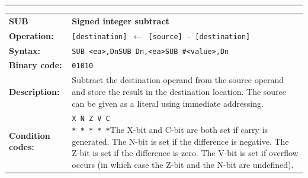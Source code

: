 \documentclass[]{article}
\begin{document}
\begin{appendices}
\noindent\rule{10cm}{1pt}\newline %
\setlength\extrarowheight{5pt} %
\begin{tabularx}{\textwidth}{lL}
  {\Large \textbf{SUB}} 	& {\Large \textbf{Signed integer subtract}}\\
  \textbf{Operation:} 		& \texttt{[destination] $\leftarrow$ [source] - [destination]}\\
  \textbf{Syntax:}  		& \texttt{SUB <ea>,Dn}\newline\texttt{SUB Dn,<ea>}\newline\texttt{SUB \#<value>,Dn}\\
  \textbf{Binary code:} 	& \texttt{01010}\\
  \textbf{Description:}  	& Subtract the destination operand from the source operand and store the
result in the destination location. The source can be given as a literal using immediate addressing.\\
  \textbf{Condition codes:} & \texttt{X N Z V C\newline * * * * *}\newline\newline The X-bit and C-bit are both set if carry is generated. The N-bit is set if the difference is negative. The Z-bit is set if the difference is zero. The V-bit is set if overflow occurs (in which case the Z-bit and the N-bit are undefined).\\
\end{tabularx}
\newline


\end{appendices}
\end{document}
